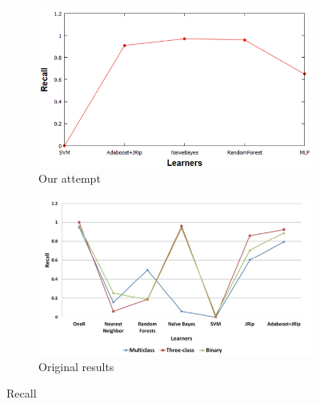 \begin{figure}[H]
    \centering
    \begin{subfigure}[t]{0.5\textwidth}
        \includegraphics[width=\linewidth]{images/weka_recall.png}
        \caption{Our attempt}
    \end{subfigure}%
    \begin{subfigure}[t]{0.5\textwidth}
        \includegraphics[width=\linewidth]{images/weka_recall_cite.png}
        \caption{Original results \cite{borges_hink_machine_2014-1}}
    \end{subfigure}
    \caption{Recall}
    \label{fig:weka_recall}
\end{figure}

